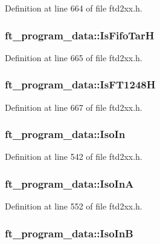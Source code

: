 Definition at line 664 of file ftd2xx.h.\hypertarget{structft__program__data_ab9cf4df075da21102def2162c3d281d1}{
\subsubsection[{IsFifoTarH}]{ {\bf ft\_\-program\_\-data::IsFifoTarH}}}
\label{structft__program__data_ab9cf4df075da21102def2162c3d281d1}


Definition at line 665 of file ftd2xx.h.\hypertarget{structft__program__data_a449c65a49b91d6c34045632b662834ab}{
\subsubsection[{IsFT1248H}]{ {\bf ft\_\-program\_\-data::IsFT1248H}}}
\label{structft__program__data_a449c65a49b91d6c34045632b662834ab}


Definition at line 667 of file ftd2xx.h.\hypertarget{structft__program__data_aa471198716a078ba145f1590388f7ccd}{
\subsubsection[{IsoIn}]{ {\bf ft\_\-program\_\-data::IsoIn}}}
\label{structft__program__data_aa471198716a078ba145f1590388f7ccd}


Definition at line 542 of file ftd2xx.h.\hypertarget{structft__program__data_ab617e7e2235a84c8cf5c62a05f977eeb}{
\subsubsection[{IsoInA}]{ {\bf ft\_\-program\_\-data::IsoInA}}}
\label{structft__program__data_ab617e7e2235a84c8cf5c62a05f977eeb}


Definition at line 552 of file ftd2xx.h.\hypertarget{structft__program__data_acd261bec5257b91b7a3e371da9f25e47}{
\subsubsection[{IsoInB}]{ {\bf ft\_\-program\_\-data::IsoInB}}}
\label{structft__program__data_acd261bec5257b91b7a3e371da9f25e47}


